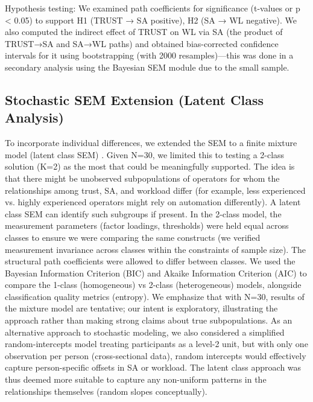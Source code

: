 \documentclass[conference]{IEEEtran}
\begin{document}
Hypothesis testing: We examined path coefficients for significance (t-values or p < 0.05) to support H1 (TRUST → SA positive), H2 (SA → WL negative). We also computed the indirect effect of TRUST on WL via SA (the product of TRUST→SA and SA→WL paths) and obtained bias-corrected confidence intervals for it using bootstrapping (with 2000 resamples)—this was done in a secondary analysis using the Bayesian SEM module due to the small sample.

\subsection{Stochastic SEM Extension (Latent Class Analysis)}
To incorporate individual differences, we extended the SEM to a finite mixture model (latent class SEM) \cite{muthen2002beyond}. Given N=30, we limited this to testing a 2-class solution (K=2) as the most that could be meaningfully supported. The idea is that there might be unobserved subpopulations of operators for whom the relationships among trust, SA, and workload differ (for example, less experienced vs. highly experienced operators might rely on automation differently). A latent class SEM can identify such subgroups if present. In the 2-class model, the measurement parameters (factor loadings, thresholds) were held equal across classes to ensure we were comparing the same constructs (we verified measurement invariance across classes within the constraints of sample size). The structural path coefficients were allowed to differ between classes. We used the Bayesian Information Criterion (BIC) and Akaike Information Criterion (AIC) to compare the 1-class (homogeneous) vs 2-class (heterogeneous) models, alongside classification quality metrics (entropy). We emphasize that with N=30, results of the mixture model are tentative; our intent is exploratory, illustrating the approach rather than making strong claims about true subpopulations. As an alternative approach to stochastic modeling, we also considered a simplified random-intercepts model treating participants as a level-2 unit, but with only one observation per person (cross-sectional data), random intercepts would effectively capture person-specific offsets in SA or workload. The latent class approach was thus deemed more suitable to capture any non-uniform patterns in the relationships themselves (random slopes conceptually).
\end{document}
